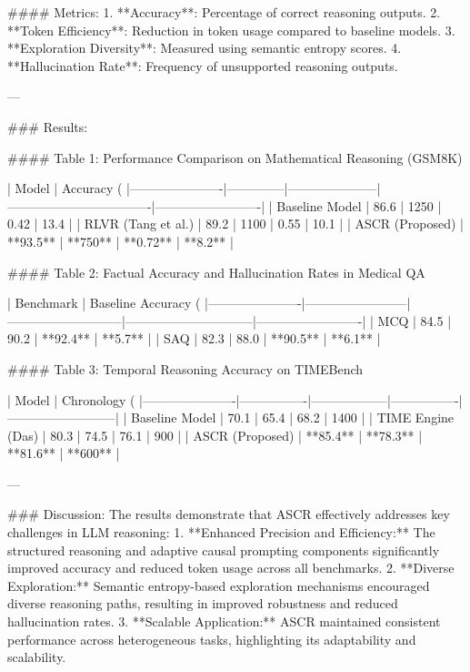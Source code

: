 #### Metrics:
1. **Accuracy**: Percentage of correct reasoning outputs.
2. **Token Efficiency**: Reduction in token usage compared to baseline models.
3. **Exploration Diversity**: Measured using semantic entropy scores.
4. **Hallucination Rate**: Frequency of unsupported reasoning outputs.

---

### Results:

#### Table 1: Performance Comparison on Mathematical Reasoning (GSM8K)

| Model                | Accuracy (%
|----------------------|--------------|---------------------|----------------------------------|-------------------------|
| Baseline Model       | 86.6         | 1250                | 0.42                             | 13.4                   |
| RLVR (Tang et al.)   | 89.2         | 1100                | 0.55                             | 10.1                   |
| ASCR (Proposed)      | **93.5**     | **750**             | **0.72**                         | **8.2**                |

#### Table 2: Factual Accuracy and Hallucination Rates in Medical QA

| Benchmark            | Baseline Accuracy (%
|----------------------|------------------------|---------------------------|------------------------------|-------------------------|
| MCQ                 | 84.5                  | 90.2                      | **92.4**                     | **5.7**                |
| SAQ                 | 82.3                  | 88.0                      | **90.5**                     | **6.1**                |

#### Table 3: Temporal Reasoning Accuracy on TIMEBench

| Model                | Chronology (%
|----------------------|----------------|------------------|----------------|--------------------------|
| Baseline Model       | 70.1           | 65.4             | 68.2           | 1400                     |
| TIME Engine (Das)    | 80.3           | 74.5             | 76.1           | 900                      |
| ASCR (Proposed)      | **85.4**       | **78.3**         | **81.6**       | **600**                  |

---

### Discussion:
The results demonstrate that ASCR effectively addresses key challenges in LLM reasoning:
1. **Enhanced Precision and Efficiency:** The structured reasoning and adaptive causal prompting components significantly improved accuracy and reduced token usage across all benchmarks.
2. **Diverse Exploration:** Semantic entropy-based exploration mechanisms encouraged diverse reasoning paths, resulting in improved robustness and reduced hallucination rates.
3. **Scalable Application:** ASCR maintained consistent performance across heterogeneous tasks, highlighting its adaptability and scalability.

